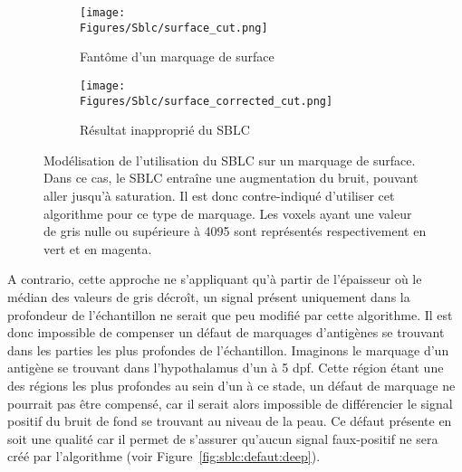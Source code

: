 \documentclass[\main/main.tex]{subfiles}
\begin{document}
\begin{figure}
    \centering
    \begin{subfigure}[b]{0.45\textwidth}
        
        \caption{Fantôme d'un marquage de surface}
        \centering \texttt{[image: \\Figures/Sblc/surface\_cut.png]}
        \label{fig:sblc:defaut:surface:fantôme}
    \end{subfigure}
    \begin{subfigure}[b]{0.45\textwidth} 
        \caption{Résultat inapproprié du SBLC}
        \centering \texttt{[image: \\Figures/Sblc/surface\_corrected\_cut.png]}
        \label{fig:sblc:defaut:surface:application}
    \end{subfigure}
    \caption{
        Modélisation de l'utilisation du SBLC sur un marquage de surface.
        \newline
        Dans ce cas, le SBLC entraîne une augmentation du bruit, pouvant aller jusqu'à saturation.
        Il est donc contre\hyp{}indiqué d'utiliser cet algorithme pour ce type de marquage.
        \newline
        Les voxels ayant une valeur de gris nulle ou supérieure à 4095 sont représentés respectivement en vert et en magenta.
        }
    \label{fig:sblc:defaut:surface}
\end{figure}

%
A contrario, cette approche ne s'appliquant qu'à partir de l'épaisseur où le médian des valeurs de gris décroît, un signal présent uniquement dans la profondeur de l'échantillon ne serait que peu modifié par cette algorithme.
%
Il est donc impossible de compenser un défaut de marquages d'antigènes se trouvant dans les parties les plus profondes de l'échantillon.
%
Imaginons le marquage d'un antigène se trouvant dans l'hypothalamus d'un \pz{} à 5 dpf.
%
Cette région étant une des régions les plus profondes au sein d'un \pz{} à ce stade, un défaut de marquage ne pourrait pas être compensé, car il serait alors impossible de différencier le signal positif du bruit de fond se trouvant au niveau de la peau.
%
Ce défaut présente en soit une qualité car il permet de s'assurer qu'aucun signal faux-positif ne sera créé par l'algorithme  (voir Figure~\ref{fig:sblc:defaut:deep}).
\end{document}

